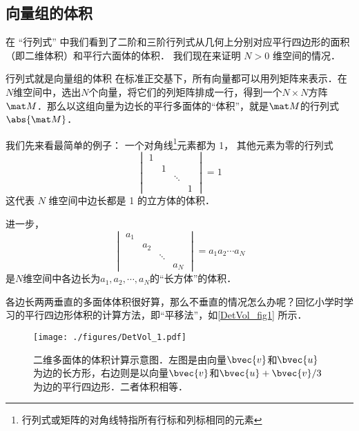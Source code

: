 



\subsection{向量组的体积}

在 “行列式” 中我们看到了二阶和三阶行列式从几何上分别对应平行四边形的面积（即二维体积）和平行六面体的体积． 我们现在来证明 $N > 0$ 维空间的情况．

\begin{theorem}{行列式就是向量组的体积}
在标准正交基下，所有向量都可以用列矩阵来表示．在$N$维空间中，选出$N$个向量，将它们的列矩阵排成一行，得到一个$N\times N$方阵$\mat M$．那么以这组向量为边长的平行多面体的“体积”，就是$\mat M$的行列式$\abs{\mat M}$．
\end{theorem}


我们先来看最简单的例子： 一个对角线\footnote{行列式或矩阵的对角线特指所有行标和列标相同的元素}元素都为 1， 其他元素为零的行列式
\begin{equation}
\begin{vmatrix}
1 & & &\\
  & 1 & &\\
  &  & \ddots &\\
  & & & 1
\end{vmatrix} = 1
\end{equation}
这代表 $N$ 维空间中边长都是 1 的立方体的体积．

进一步，
\begin{equation}
\begin{vmatrix}
a_1 & & &\\
  & a_2 & &\\
  &  & \ddots &\\
  & & & a_N
\end{vmatrix} = a_1a_2\cdots a_N
\end{equation}
是$N$维空间中各边长为$a_1, a_2, \cdots, a_N$的“长方体”的体积．

各边长两两垂直的多面体体积很好算，那么不垂直的情况怎么办呢？回忆小学时学习的平行四边形体积的计算方法，即“平移法”，如\autoref{DetVol_fig1} 所示．
\begin{figure}[ht]
\centering
\texttt{[image: ./figures/DetVol\_1.pdf]}
\caption{二维多面体的体积计算示意图．左图是由向量$\bvec{v}$和$\bvec{u}$为边的长方形，右边则是以向量$\bvec{v}$和$\bvec{u}+\bvec{v}/3$为边的平行四边形．二者体积相等．} \label{DetVol_fig1}
\end{figure}

